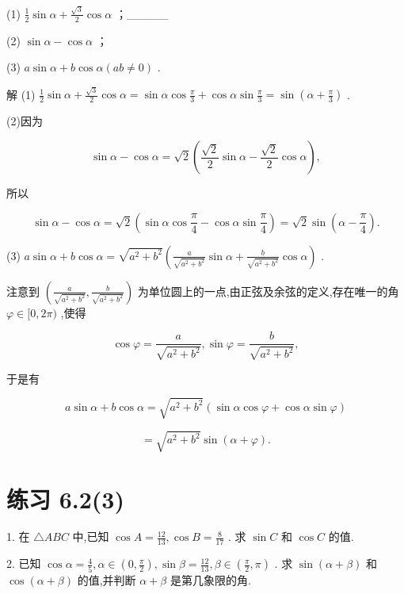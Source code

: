 \documentclass[10pt]{article}
\begin{document}
(1) \(\frac{1}{2}\sin \alpha  + \frac{\sqrt{3}}{2}\cos \alpha\) ；\_\_\_\_\_

(2) \(\sin \alpha  - \cos \alpha\) ；

(3) \(a\sin \alpha  + b\cos \alpha \left( {{ab} \neq  0}\right)\) .

解 (1) \(\frac{1}{2}\sin \alpha  + \frac{\sqrt{3}}{2}\cos \alpha  = \sin \alpha \cos \frac{\pi }{3} + \cos \alpha \sin \frac{\pi }{3} = \sin \left( {\alpha  + \frac{\pi }{3}}\right)\) .

(2)因为

\[
\sin \alpha  - \cos \alpha  = \sqrt{2}\left( {\frac{\sqrt{2}}{2}\sin \alpha  - \frac{\sqrt{2}}{2}\cos \alpha }\right) ,
\]

所以

\[
\sin \alpha  - \cos \alpha  = \sqrt{2}\left( {\sin \alpha \cos \frac{\pi }{4} - \cos \alpha \sin \frac{\pi }{4}}\right)  = \sqrt{2}\sin \left( {\alpha  - \frac{\pi }{4}}\right) .
\]

(3) \(a\sin \alpha  + b\cos \alpha  = \sqrt{{a}^{2} + {b}^{2}}\left( {\frac{a}{\sqrt{{a}^{2} + {b}^{2}}}\sin \alpha  + \frac{b}{\sqrt{{a}^{2} + {b}^{2}}}\cos \alpha }\right)\) .

注意到 \(\left( {\frac{a}{\sqrt{{a}^{2} + {b}^{2}}},\frac{b}{\sqrt{{a}^{2} + {b}^{2}}}}\right)\) 为单位圆上的一点,由正弦及余弦的定义,存在唯一的角 \(\varphi  \in  \lbrack 0,{2\pi })\) ,使得

\[
\cos \varphi  = \frac{a}{\sqrt{{a}^{2} + {b}^{2}}},\sin \varphi  = \frac{b}{\sqrt{{a}^{2} + {b}^{2}}},
\]

于是有

\[
a\sin \alpha  + b\cos \alpha  = \sqrt{{a}^{2} + {b}^{2}}\left( {\sin \alpha \cos \varphi  + \cos \alpha \sin \varphi }\right)
\]

\[
= \sqrt{{a}^{2} + {b}^{2}}\sin \left( {\alpha  + \varphi }\right) .
\]

\section*{练习 6.2(3)}

1. 在 \(\bigtriangleup {ABC}\) 中,已知 \(\cos A = \frac{12}{13},\cos B = \frac{8}{17}\) . 求 \(\sin C\) 和 \(\cos C\) 的值.

2. 已知 \(\cos \alpha  = \frac{4}{5},\alpha  \in  \left( {0,\frac{\pi }{2}}\right) ,\sin \beta  = \frac{12}{13},\beta  \in  \left( {\frac{\pi }{2},\pi }\right)\) . 求 \(\sin \left( {\alpha  + \beta }\right)\) 和 \(\cos \left( {\alpha  + \beta }\right)\) 的值,并判断 \(\alpha  + \beta\) 是第几象限的角.
\end{document}
